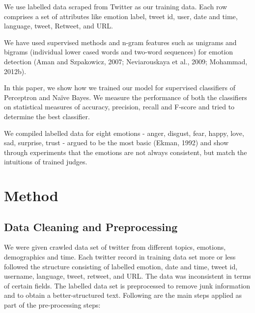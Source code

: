 \documentclass[11pt]{article}
\begin{document}
  We use labelled data scraped from Twitter as our training data. Each row comprises a set of attributes like emotion label, tweet id, user, date and time, language, tweet, Retweet, and URL.
       
  We have used supervised methods and n-gram features such as unigrams and bigrams (individual lower cased words and two-word sequences) for emotion detection (Aman and Szpakowicz, 2007; Neviarouskaya et al., 2009; Mohammad, 2012b).
  
  In this paper, we show how we trained our model for supervised classifiers of Perceptron and Naïve Bayes. We measure the performance of both the classifiers on statistical measures of accuracy, precision, recall and F-score and tried to determine the best classifier.
   
  We compiled labelled data for eight emotions - anger, disgust, fear, happy, love, sad, surprise, trust - argued to be the most basic (Ekman, 1992) and show through experiments that the emotions are not always consistent, but match the intuitions of trained judges.
  
  \section{Method}
  
  \subsection{Data Cleaning and Preprocessing}
  
  We were given crawled data set of twitter from different topics, emotions, demographics and time. Each twitter record in training data set more or less followed the structure consisting of labelled emotion, date and time, tweet id, username, language, tweet, retweet, and URL. The data was inconsistent in terms of certain fields. The labelled data set is preprocessed to remove junk information and to obtain a better-structured text. Following are the main steps applied as part of the pre-processing steps:
  
\end{document}
